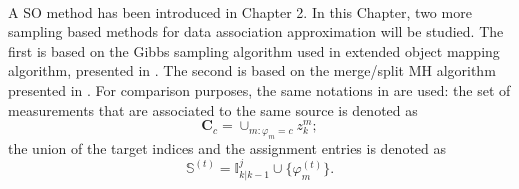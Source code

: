 ~\\
A SO method has been introduced in Chapter 2. In this Chapter, two more sampling based methods for data association approximation will be studied. The first is based on the Gibbs sampling algorithm used in extended object mapping algorithm, presented in \cite{gibbs}. The second is based on the merge/split MH algorithm presented in \cite{mergesplit}. For comparison purposes, the same notations in \cite{soextended} are used: the set of measurements that are associated to the same source is denoted as
\begin{equation}
    \mathbf{C}_c = \cup_{m:\varphi_m=c}z_k^m;
\end{equation}
the union of the target indices and the assignment entries is denoted as
\begin{equation}
    \mathbb{S}^{(t)} = \mathbb{I}^j_{k|k-1}\cup\{\varphi^{(t)}_m\}.
\end{equation}





